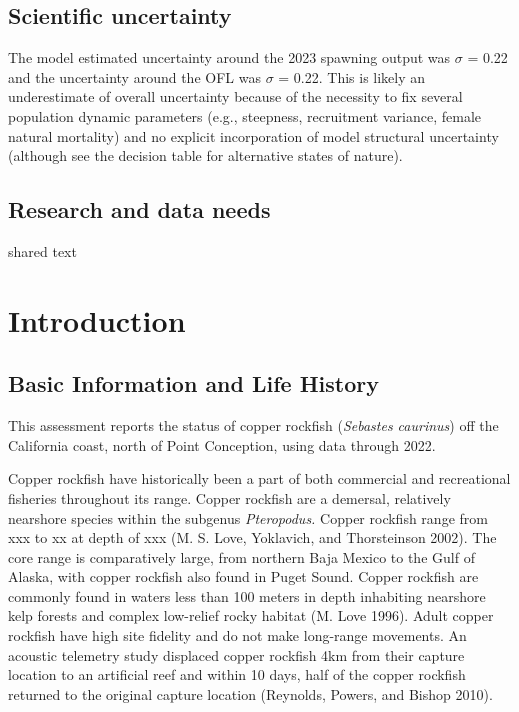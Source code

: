 \documentclass[11pt,
  english,
  letterpaper,
]{article}
\begin{document}
\hypertarget{scientific-uncertainty}{%
\subsection*{Scientific uncertainty}\label{scientific-uncertainty}}

The model estimated uncertainty around the 2023 spawning output was \(\sigma\) = 0.22 and the uncertainty around the OFL was \(\sigma\) = 0.22. This is likely an underestimate of overall uncertainty because of the necessity to fix several population dynamic parameters (e.g., steepness, recruitment variance, female natural mortality) and no explicit incorporation of model structural uncertainty (although see the decision table for alternative states of nature).

\hypertarget{research-and-data-needs}{%
\subsection*{Research and data needs}\label{research-and-data-needs}}

shared text

\hypertarget{introduction}{%
\section{Introduction}\label{introduction}}

\hypertarget{basic-information-and-life-history}{%
\subsection{Basic Information and Life History}\label{basic-information-and-life-history}}

This assessment reports the status of copper rockfish (\emph{Sebastes caurinus}) off the California coast, north of Point Conception, using data through 2022.

Copper rockfish have historically been a part of both commercial and recreational fisheries throughout its range. Copper rockfish are a demersal, relatively nearshore species within the subgenus \emph{Pteropodus.} Copper rockfish range from xxx to xx at depth of xxx (M. S. Love, Yoklavich, and Thorsteinson 2002). The core range is comparatively large, from northern Baja Mexico to the Gulf of Alaska, with copper rockfish also found in Puget Sound. Copper rockfish are commonly found in waters less than 100 meters in depth inhabiting nearshore kelp forests and complex low-relief rocky habitat (M. Love 1996). Adult copper rockfish have high site fidelity and do not make long-range movements. An acoustic telemetry study displaced copper rockfish 4km from their capture location to an artificial reef and within 10 days, half of the copper rockfish returned to the original capture location (Reynolds, Powers, and Bishop 2010).
\end{document}
